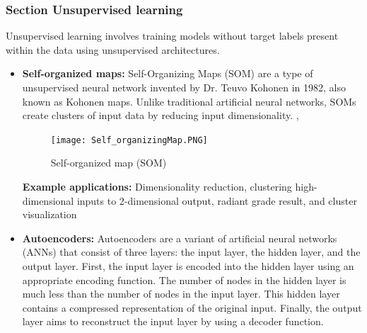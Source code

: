 \subsubsection{Section Unsupervised learning}

Unsupervised learning involves training models without target labels present within the data using unsupervised architectures.\cite{coates2011analysis}
\begin{itemize}
    \item \textbf{Self-organized maps: } Self-Organizing Maps (SOM) are a type of unsupervised neural network invented by Dr. Teuvo Kohonen in 1982, also known as Kohonen maps. Unlike traditional artificial neural networks, SOMs create clusters of input data by reducing input dimensionality. \cite{alzubaidi2021review}, \cite{madhavan2017deep}

    \begin{figure}[H]
        \centering
        \texttt{[image: Self\_organizingMap.PNG]}
        \caption{Self-organized map (SOM)}
        \label{fig:Self-organized map (SOM)}
    \end{figure}
    \textbf{Example applications:} Dimensionality reduction, clustering high-dimensional inputs to 2-dimensional output, radiant grade result, and cluster visualization
    \item \textbf{Autoencoders: } Autoencoders are a variant of artificial neural networks (ANNs) that consist of three layers: the input layer, the hidden layer, and the output layer. First, the input layer is encoded into the hidden layer using an appropriate encoding function. The number of nodes in the hidden layer is much less than the number of nodes in the input layer. This hidden layer contains a compressed representation of the original input. Finally, the output layer aims to reconstruct the input layer by using a decoder function.
    

\end{itemize}
